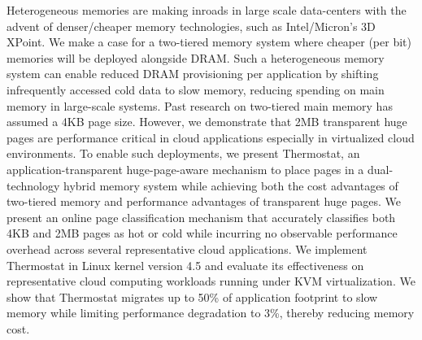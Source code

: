 Heterogeneous memories are making inroads in large scale data-centers with the
advent of denser/cheaper memory technologies, such as Intel/Micron’s 3D XPoint.
We make a case for a two-tiered memory system where cheaper (per bit) memories
will be deployed alongside DRAM. Such a heterogeneous memory system can enable
reduced DRAM provisioning per application by shifting infrequently accessed cold
data to slow memory, reducing spending on main memory in large-scale systems.
Past research on two-tiered main memory has assumed a 4KB page size.  However,
we demonstrate that 2MB transparent huge pages are performance critical in
cloud applications especially in virtualized cloud environments.  To enable such
deployments, we present Thermostat, an application-transparent huge-page-aware
mechanism to place pages in a dual-technology hybrid memory system while
achieving both the cost advantages of two-tiered memory and performance
advantages of transparent huge pages.  We present an online page classification
mechanism that accurately classifies both 4KB and 2MB pages as hot or cold while
incurring no observable performance overhead across several representative cloud
applications. We implement Thermostat in Linux kernel version 4.5 and evaluate
its effectiveness on representative cloud computing workloads running under KVM
virtualization. We show that Thermostat migrates up to 50\% of application
footprint to slow memory while limiting performance degradation to 3\%, thereby
reducing memory cost.
